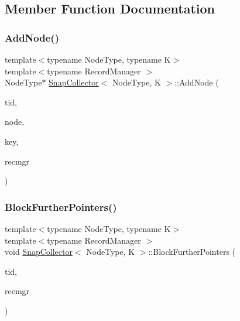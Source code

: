 \subsection{Member Function Documentation}
\mbox{\label{classSnapCollector_aab421d45e780e447bb9b5b872fa368f9}} 
\subsubsection{\texorpdfstring{Add\+Node()}{AddNode()}}
{\footnotesize\ttfamily template$<$typename Node\+Type, typename K$>$ \\
template$<$typename Record\+Manager $>$ \\
Node\+Type$\ast$ \hyperlink{classSnapCollector}{Snap\+Collector}$<$ Node\+Type, K $>$\+::Add\+Node (\begin{DoxyParamCaption}\item[{const int}]{tid,  }\item[{Node\+Type $\ast$}]{node,  }\item[{K}]{key,  }\item[{Record\+Manager $\ast$}]{recmgr }\end{DoxyParamCaption})\hspace{0.3cm}{\ttfamily [inline]}}

\mbox{\label{classSnapCollector_a53b4976ed927e14a99bb52993ffd5a2b}} 
\subsubsection{\texorpdfstring{Block\+Further\+Pointers()}{BlockFurtherPointers()}}
{\footnotesize\ttfamily template$<$typename Node\+Type, typename K$>$ \\
template$<$typename Record\+Manager $>$ \\
void \hyperlink{classSnapCollector}{Snap\+Collector}$<$ Node\+Type, K $>$\+::Block\+Further\+Pointers (\begin{DoxyParamCaption}\item[{const int}]{tid,  }\item[{Record\+Manager $\ast$}]{recmgr }\end{DoxyParamCaption})\hspace{0.3cm}{\ttfamily [inline]}}

